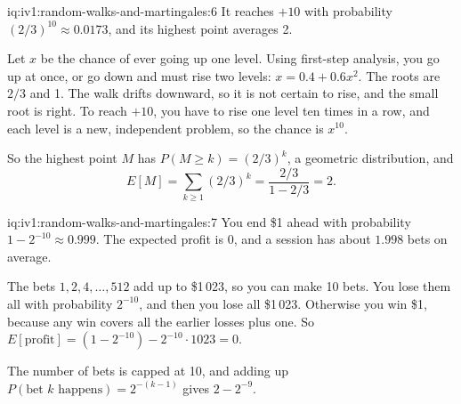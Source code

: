 \begin{solution}{iq:iv1:random-walks-and-martingales:6}
It reaches $+10$ with probability $(2/3)^{10} \approx 0.0173$, and its highest point averages 2.

Let $x$ be the chance of ever going up one level. Using first-step analysis, you go up at once, or go down and must rise two levels: $x = 0.4 + 0.6 x^2$. The roots are $2/3$ and 1. The walk drifts downward, so it is not certain to rise, and the small root is right. To reach $+10$, you have to rise one level ten times in a row, and each level is a new, independent problem, so the chance is $x^{10}$.

So the highest point $M$ has $P(M \ge k) = (2/3)^k$, a geometric distribution, and
\[
E[M] = \sum_{k \ge 1} (2/3)^k = \frac{2/3}{1 - 2/3} = 2.
\]
\end{solution}

\begin{solution}{iq:iv1:random-walks-and-martingales:7}
You end \$1 ahead with probability $1 - 2^{-10} \approx 0.999$. The expected profit is 0, and a session has about $1.998$ bets on average.

The bets $1, 2, 4, \dots, 512$ add up to \$1\,023, so you can make 10 bets. You lose them all with probability $2^{-10}$, and then you lose all \$1\,023. Otherwise you win \$1, because any win covers all the earlier losses plus one. So $E[\text{profit}] = (1 - 2^{-10}) - 2^{-10} \cdot 1023 = 0$.

The number of bets is capped at 10, and adding up $P(\text{bet } k \text{ happens}) = 2^{-(k - 1)}$ gives $2 - 2^{-9}$.

\end{solution}

